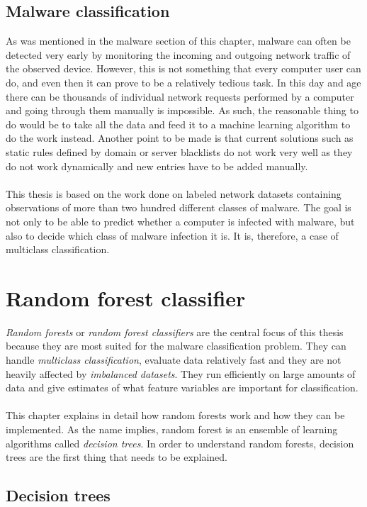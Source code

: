 \documentclass[11pt]{article}
\begin{document}
    \subsection{Malware classification}
      As was mentioned in the malware section of this chapter, malware can often be detected very early by monitoring the incoming and outgoing network traffic of the observed device. However, this is not something that every computer user can do, and even then it can prove to be a relatively tedious task. In this day and age there can be thousands of individual network requests performed by a computer and going through them manually is impossible. As such, the reasonable thing to do would be to take all the data and feed it to a machine learning algorithm to do the work instead. Another point to be made is that current solutions such as static rules defined by domain or server blacklists do not work very well as they do not work dynamically and new entries have to be added manually.
      \\~\\
      This thesis is based on the work done on labeled network datasets containing observations of more than two hundred different classes of malware. The goal is not only to be able to predict whether a computer is infected with malware, but also to decide which class of malware infection it is. It is, therefore, a case of multiclass classification.
      
  \newpage
  \section{Random forest classifier}
    {\it Random forests} or {\it random forest classifiers} are the central focus of this thesis because they are most suited for the malware classification problem. They can handle {\it multiclass classification}, evaluate data relatively fast and they are not heavily affected by {\it imbalanced datasets}. \cite{brabec} They run efficiently on large amounts of data and give estimates of what feature variables are important for classification. \cite{breiman}
    \\~\\
    This chapter explains in detail how random forests work and how they can be implemented. As the name implies, random forest is an ensemble of learning algorithms called {\it decision trees}. In order to understand random forests, decision trees are the first thing that needs to be explained.
    \subsection{Decision trees}
\end{document}
